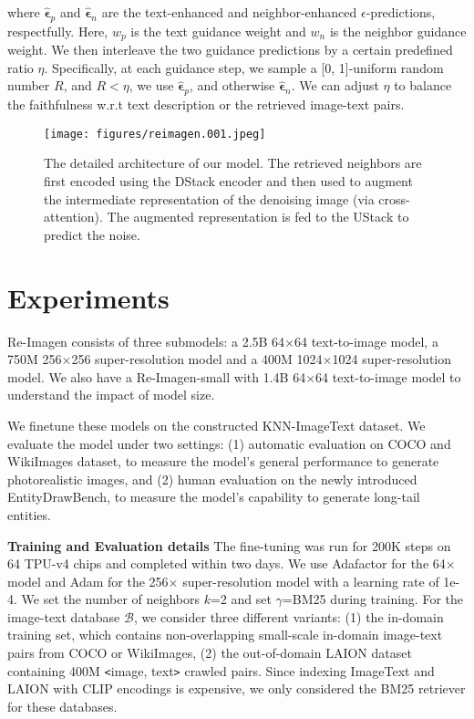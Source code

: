 \documentclass{article} \usepackage{iclr2023_conference,times}
\newcommand{\modelname}{{Re-Imagen}\xspace}
\begin{document}
where $\hat{\bm{\epsilon}}_{p}$ and $\hat{\bm{\epsilon}}_{n}$ are the text-enhanced and neighbor-enhanced $\epsilon$-predictions, respectfully. Here, $w_p$ is the text guidance weight and $w_n$ is the neighbor guidance weight. We then interleave the two guidance predictions by a certain predefined ratio $\eta$.  Specifically, at each guidance step, we sample a [0, 1]-uniform random number $R$, and $R < \eta$, we use $\hat{\bm{\epsilon}}_{p}$, and otherwise $\hat{\bm{\epsilon}}_{n}$. We can adjust $\eta$ to balance the faithfulness w.r.t text description or the retrieved image-text pairs. 
\begin{figure}[!t]
    \centering
    \texttt{[image: figures/reimagen.001.jpeg]}
    \caption{The detailed architecture of our model. The retrieved neighbors are first encoded using the DStack encoder and then used to augment the intermediate representation of the denoising image (via cross-attention). The augmented representation is fed to the UStack to predict the noise.}
    \label{fig:detail}
\end{figure}


\section{Experiments}
\modelname consists of three submodels: a 2.5B 64$\times$64 text-to-image model, a 750M 256$\times$256 super-resolution model and a 400M 1024$\times$1024 super-resolution model. We also have a \modelname-small with 1.4B 64$\times$64 text-to-image model to understand the impact of model size.

We finetune these models on the constructed KNN-ImageText dataset. We evaluate the model under two settings: (1) automatic evaluation on COCO and WikiImages dataset, to measure the model's general performance to generate photorealistic images, and (2) human evaluation on the newly introduced EntityDrawBench, to measure the model's capability to generate long-tail entities.

\noindent \textbf{Training and Evaluation details}
The fine-tuning was run for 200K steps on 64 TPU-v4 chips and completed within two days. We use Adafactor for the 64$\times$ model and Adam for the 256$\times$ super-resolution model with a learning rate of 1e-4. We set the number of neighbors $k$=2 and set $\gamma$=BM25 during training. For the image-text database $\mathcal{B}$, we consider three different variants: {(1)} the in-domain training set, which contains non-overlapping small-scale in-domain image-text pairs from COCO or WikiImages, {(2)} the out-of-domain LAION dataset~\citep{schuhmann2021laion} containing 400M \texttt{<}image, text\texttt{>} crawled pairs. Since indexing ImageText and LAION with CLIP encodings is expensive, we only considered the BM25 retriever for these databases. 
\end{document}
